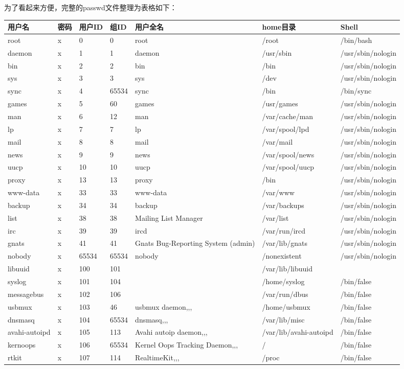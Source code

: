 {为了看起来方便，完整的passwd文件整理为表格如下：\\
{\qihao
\begin{tabular}{l|l|l|l|l|l|l}
用户名&密码&用户ID&组ID&用户全名&home目录&Shell\\
\hline
root&x&0&0&root&/root&/bin/bash\\
daemon&x&1&1&daemon&/usr/sbin&/usr/sbin/nologin\\
bin&x&2&2&bin&/bin&/usr/sbin/nologin\\
sys&x&3&3&sys&/dev&/usr/sbin/nologin\\
sync&x&4&65534&sync&/bin&/bin/sync\\
games&x&5&60&games&/usr/games&/usr/sbin/nologin\\
man&x&6&12&man&/var/cache/man&/usr/sbin/nologin\\
lp&x&7&7&lp&/var/spool/lpd&/usr/sbin/nologin\\
mail&x&8&8&mail&/var/mail&/usr/sbin/nologin\\
news&x&9&9&news&/var/spool/news&/usr/sbin/nologin\\
uucp&x&10&10&uucp&/var/spool/uucp&/usr/sbin/nologin\\
proxy&x&13&13&proxy&/bin&/usr/sbin/nologin\\
www-data&x&33&33&www-data&/var/www&/usr/sbin/nologin\\
backup&x&34&34&backup&/var/backups&/usr/sbin/nologin\\
list&x&38&38&Mailing List Manager&/var/list&/usr/sbin/nologin\\
irc&x&39&39&ircd&/var/run/ircd&/usr/sbin/nologin\\
gnats&x&41&41&Gnats Bug-Reporting System (admin)&/var/lib/gnats&/usr/sbin/nologin\\
nobody&x&65534&65534&nobody&/nonexistent&/usr/sbin/nologin\\
libuuid&x&100&101&&/var/lib/libuuid&\\
syslog&x&101&104&&/home/syslog&/bin/false\\
messagebus&x&102&106&&/var/run/dbus&/bin/false\\
usbmux&x&103&46&usbmux daemon,,,&/home/usbmux&/bin/false\\
dnsmasq&x&104&65534&dnsmasq,,,&/var/lib/misc&/bin/false\\
avahi-autoipd&x&105&113&Avahi autoip daemon,,,&/var/lib/avahi-autoipd&/bin/false\\
kernoops&x&106&65534&Kernel Oops Tracking Daemon,,,&/&/bin/false\\
rtkit&x&107&114&RealtimeKit,,,&/proc&/bin/false\\

\end{tabular}}}

